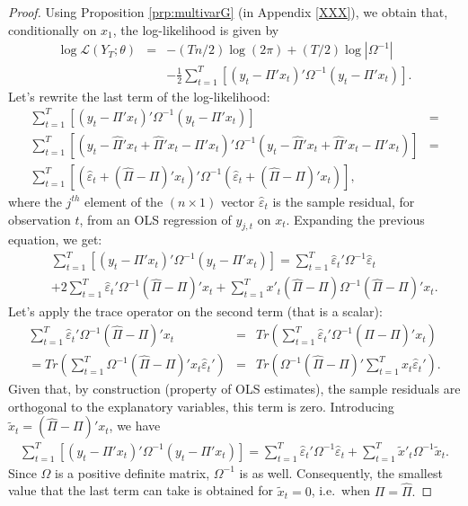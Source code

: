 \documentclass[
]{book}
\theoremstyle{definition}
\theoremstyle{definition}
\theoremstyle{definition}
\theoremstyle{definition}
\theoremstyle{remark}
\begin{document}
\begin{proof}
Using Proposition \ref{prp:multivarG} (in Appendix \ref{XXX}), we obtain that, conditionally on \(x_1\), the log-likelihood is given by
\begin{eqnarray*}
\log\mathcal{L}(Y_{T};\theta) & = & -(Tn/2)\log(2\pi)+(T/2)\log\left|\Omega^{-1}\right|\\
&  & -\frac{1}{2}\sum_{t=1}^{T}\left[\left(y_{t}-\Pi'x_{t}\right)'\Omega^{-1}\left(y_{t}-\Pi'x_{t}\right)\right].
\end{eqnarray*}
Let's rewrite the last term of the log-likelihood:
\begin{eqnarray*}
\sum_{t=1}^{T}\left[\left(y_{t}-\Pi'x_{t}\right)'\Omega^{-1}\left(y_{t}-\Pi'x_{t}\right)\right] & =\\
\sum_{t=1}^{T}\left[\left(y_{t}-\hat{\Pi}'x_{t}+\hat{\Pi}'x_{t}-\Pi'x_{t}\right)'\Omega^{-1}\left(y_{t}-\hat{\Pi}'x_{t}+\hat{\Pi}'x_{t}-\Pi'x_{t}\right)\right] & =\\
\sum_{t=1}^{T}\left[\left(\hat{\varepsilon}_{t}+(\hat{\Pi}-\Pi)'x_{t}\right)'\Omega^{-1}\left(\hat{\varepsilon}_{t}+(\hat{\Pi}-\Pi)'x_{t}\right)\right],
\end{eqnarray*}
where the \(j^{th}\) element of the \((n\times1)\) vector \(\hat{\varepsilon}_{t}\) is the sample residual, for observation \(t\), from an OLS regression of \(y_{j,t}\) on \(x_{t}\). Expanding the previous equation, we get:
\begin{eqnarray*}
&&\sum_{t=1}^{T}\left[\left(y_{t}-\Pi'x_{t}\right)'\Omega^{-1}\left(y_{t}-\Pi'x_{t}\right)\right]  = \sum_{t=1}^{T}\hat{\varepsilon}_{t}'\Omega^{-1}\hat{\varepsilon}_{t}\\
&&+2\sum_{t=1}^{T}\hat{\varepsilon}_{t}'\Omega^{-1}(\hat{\Pi}-\Pi)'x_{t}+\sum_{t=1}^{T}x'_{t}(\hat{\Pi}-\Pi)\Omega^{-1}(\hat{\Pi}-\Pi)'x_{t}.
\end{eqnarray*}
Let's apply the trace operator on the second term (that is a scalar):
\begin{eqnarray*}
\sum_{t=1}^{T}\hat{\varepsilon}_{t}'\Omega^{-1}(\hat{\Pi}-\Pi)'x_{t} & = & Tr\left(\sum_{t=1}^{T}\hat{\varepsilon}_{t}'\Omega^{-1}(\hat{\Pi}-\Pi)'x_{t}\right)\\
=  Tr\left(\sum_{t=1}^{T}\Omega^{-1}(\hat{\Pi}-\Pi)'x_{t}\hat{\varepsilon}_{t}'\right) & = & Tr\left(\Omega^{-1}(\hat{\Pi}-\Pi)'\sum_{t=1}^{T}x_{t}\hat{\varepsilon}_{t}'\right).
\end{eqnarray*}
Given that, by construction (property of OLS estimates), the sample residuals are orthogonal to the explanatory variables, this term is zero. Introducing \(\tilde{x}_{t}=(\hat{\Pi}-\Pi)'x_{t}\), we have
\begin{eqnarray*}
\sum_{t=1}^{T}\left[\left(y_{t}-\Pi'x_{t}\right)'\Omega^{-1}\left(y_{t}-\Pi'x_{t}\right)\right] =\sum_{t=1}^{T}\hat{\varepsilon}_{t}'\Omega^{-1}\hat{\varepsilon}_{t}+\sum_{t=1}^{T}\tilde{x}'_{t}\Omega^{-1}\tilde{x}_{t}.
\end{eqnarray*}
Since \(\Omega\) is a positive definite matrix, \(\Omega^{-1}\) is as well. Consequently, the smallest value that the last term can take is obtained for \(\tilde{x}_{t}=0\), i.e.~when \(\Pi=\hat{\Pi}.\)


\end{proof}
\end{document}
